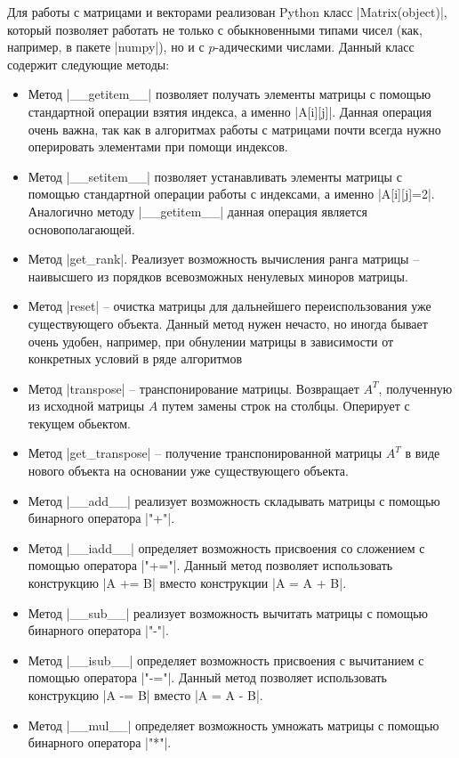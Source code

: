 \documentclass[master, och, times, pract]{sty/SCWorks}
\theoremstyle{plain}
\theoremstyle{definition}
\numberwithin{equation}{section}
\begin{document}
Для работы с матрицами и векторами реализован Python класс |Matrix(object)|, который позволяет работать не только с обыкновенными типами чисел (как, например, в пакете |numpy|), но и с $p$-адическими числами. Данный класс содержит следующие методы:

\begin{itemize}
\item Метод |__getitem__| позволяет получать элементы матрицы с помощью стандартной операции взятия индекса, а именно |A[i][j]|. Данная операция очень важна, так как в алгоритмах работы с матрицами почти всегда нужно оперировать элементами при помощи индексов.
\item Метод |__setitem__| позволяет устанавливать элементы матрицы с помощью стандартной операции работы с индексами, а именно |A[i][j]=2|. Аналогично методу |__getitem__| данная операция является основополагающей.
\item Метод |get_rank|. Реализует возможность вычисления ранга матрицы -- наивысшего из порядков всевозможных ненулевых миноров матрицы.
\item Метод |reset| -- очистка матрицы для дальнейшего переиспользования уже существующего объекта. Данный метод нужен нечасто, но иногда бывает очень удобен, например, при обнулении матрицы в зависимости от конкретных условий в ряде алгоритмов
\item Метод |transpose| -- транспонирование матрицы. Возвращает $A^{T}$, полученную из исходной матрицы $A$ путем замены строк на столбцы. Оперирует с текущем обьектом.
\item Метод |get_transpose| -- получение транспонированной матрицы $A^{T}$ в виде нового объекта на основании уже существующего объекта.
\item Метод |__add__| реализует возможность складывать матрицы с помощью бинарного оператора |"+"|.
\item Метод |__iadd__| определяет возможность присвоения со сложением с помощью оператора |"+="|. Данный метод позволяет использовать конструкцию |A += B| вместо конструкции |A = A + B|.
\item Метод |__sub__| реализует возможность вычитать матрицы с помощью бинарного оператора |"-"|.
\item Метод |__isub__| определяет возможность присвоения с вычитанием с помощью оператора |"-="|. Данный метод позволяет использовать конструкцию |A -= B| вместо |A = A - B|.
\item Метод |__mul__| определяет возможность умножать матрицы с помощью бинарного оператора |"*"|.

\end{itemize}
\end{document}

